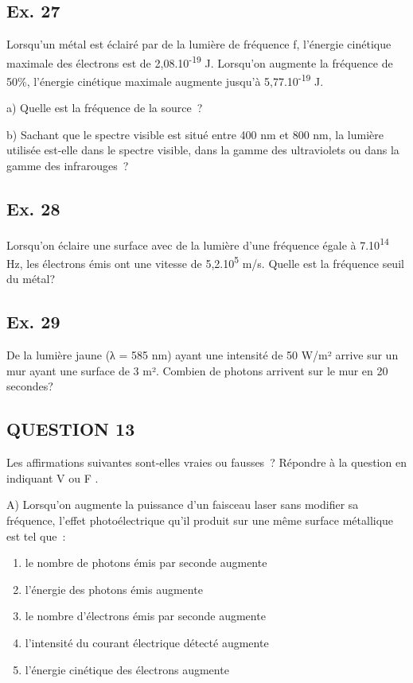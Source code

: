 {\subsection{Ex. 27}

Lorsqu'un métal est éclairé par de la lumière de fréquence f, l'énergie
cinétique maximale des électrons est de 2,08.10\textsuperscript{-19} J.
Lorsqu'on augmente la fréquence de 50\%, l'énergie cinétique maximale
augmente jusqu'à 5,77.10\textsuperscript{-19} J.

a) Quelle est la fréquence de la source~?

b) Sachant que le spectre visible est situé entre 400 nm et 800 nm, la
lumière utilisée est-elle dans le spectre visible, dans la gamme des
ultraviolets ou dans la gamme des infrarouges~?

\subsection{Ex. 28}

Lorsqu'on éclaire une surface avec de la lumière d'une fréquence égale à
7.10\textsuperscript{14 }Hz, les électrons émis ont une vitesse de
5,2.10\textsuperscript{5} m/s. Quelle est la fréquence seuil du métal?

\subsection{Ex. 29}

De la lumière jaune (λ = 585 nm) ayant une intensité de 50 W/m² arrive
sur un mur ayant une surface de 3 m². Combien de photons arrivent sur le
mur en 20 secondes?

\subsection{QUESTION 13}

Les affirmations suivantes sont-elles vraies ou fausses~? Répondre à la
question en indiquant V ou F .

A) Lorsqu'on augmente la puissance d'un faisceau laser sans modifier sa
fréquence, l'effet photoélectrique qu'il produit sur une même surface
métallique est tel que~:
\begin{enumerate}
\item  le nombre de photons émis par seconde augmente
\item  l'énergie des photons émis augmente
\item  le nombre d'électrons émis par seconde augmente
\item  l'intensité du courant électrique détecté augmente
\item  l'énergie cinétique des électrons augmente
\end{enumerate}

}
